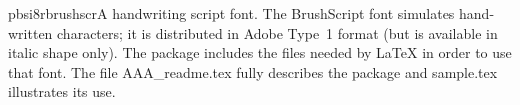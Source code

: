 \documentclass{ddltxtyp}
\begin{document}

\begin{package}{pbsi8r}{brushscr}{A handwriting script font.}
The BrushScript font simulates hand-written characters; it is
distributed in Adobe Type~1 format (but is available in italic
shape only). The package includes the files needed by {\LaTeX} in
order to use that font. The file AAA\_readme.tex fully describes
the package and sample.tex illustrates its use.
\end{package}
\end{document}
